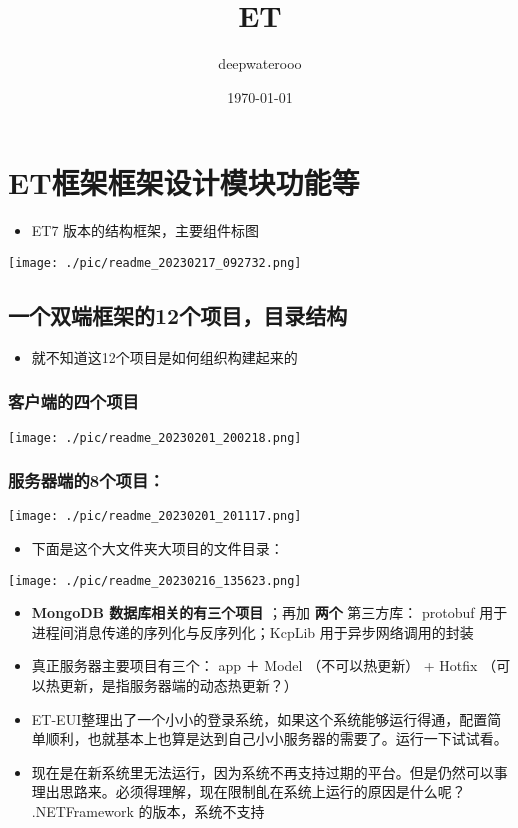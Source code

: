 \documentclass[9pt, b5paper]{article}
\author{deepwaterooo}
\date{\today}
\title{ET}
\begin{document}
\maketitle
\tableofcontents


\section{ET框架框架设计模块功能等}
\label{sec-1}
\begin{itemize}
\item ET7 版本的结构框架，主要组件标图
\end{itemize}

\texttt{[image: ./pic/readme\_20230217\_092732.png]}
\subsection{一个双端框架的12个项目，目录结构}
\label{sec-1-1}
\begin{itemize}
\item 就不知道这12个项目是如何组织构建起来的
\end{itemize}
\subsubsection{客户端的四个项目}
\label{sec-1-1-1}

\texttt{[image: ./pic/readme\_20230201\_200218.png]}
\subsubsection{服务器端的8个项目：}
\label{sec-1-1-2}

\texttt{[image: ./pic/readme\_20230201\_201117.png]}
\begin{itemize}
\item 下面是这个大文件夹大项目的文件目录：
\end{itemize}

\texttt{[image: ./pic/readme\_20230216\_135623.png]}
\begin{itemize}
\item \textbf{MongoDB 数据库相关的有三个项目} ；再加 \textbf{两个} 第三方库： protobuf 用于进程间消息传递的序列化与反序列化；KcpLib 用于异步网络调用的封装
\item 真正服务器主要项目有三个： app ＋ Model （不可以热更新） + Hotfix （可以热更新，是指服务器端的动态热更新？）
\item ET-EUI整理出了一个小小的登录系统，如果这个系统能够运行得通，配置简单顺利，也就基本上也算是达到自己小小服务器的需要了。运行一下试试看。
\item 现在是在新系统里无法运行，因为系统不再支持过期的平台。但是仍然可以事理出思路来。必须得理解，现在限制臫在系统上运行的原因是什么呢？ .NETFramework 的版本，系统不支持
\end{itemize}
\end{document}
